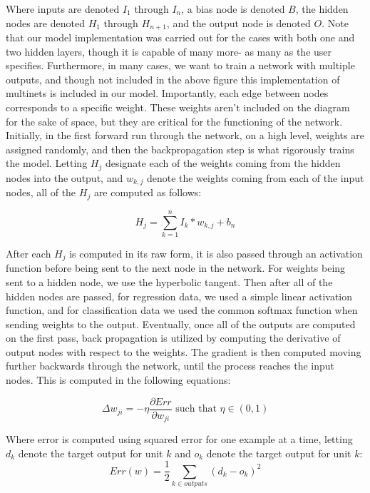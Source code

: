 \documentclass[twoside,11pt]{article}
\begin{document}
Where inputs are denoted $I_1$ through $I_n$, a bias node is denoted $B$, the hidden nodes are denoted $H_1$ through $H_{n+1}$, and 
the output node is denoted $O$. Note that our model implementation was carried out for the cases with both one and two hidden layers, though
it is capable of many more- as many as the user specifies.
Furthermore, in many cases, we want to train a network with multiple outputs, and though not included in the above figure this implementation
of multinets is included in our model.
Importantly, each edge between nodes corresponds to a specific weight. These weights aren't included on
the diagram for the sake of space, but they are critical for the functioning of the network. Initially, in the first forward run through the network, 
on a high level, weights are assigned randomly, and then the backpropagation
step is what rigorously trains the model.
Letting $H_j$ designate each of the weights coming from the hidden nodes into the output, and $w_{k,j}$ denote the weights coming from
each of the input nodes, all of the $H_j$ are computed as follows:

\begin{equation}
	H_j = \sum_{k = 1}^{n} I_k*w_{k,j} + b_n
\end{equation}

After each $H_j$ is computed in its raw form, it is also passed through an activation function before being sent to the next node in the network.
For weights being sent to a hidden node, we use the hyperbolic tangent.
Then after all of the hidden nodes are passed, for regression data, we used a simple linear activation function, and for classification data we used 
the common softmax function when sending weights to the output.
Eventually, once all of the outputs are computed on the first pass, back propagation is utilized by computing the derivative of output nodes 
with respect to the weights. The gradient is then computed moving further backwards through the network, until the process reaches
the input nodes. This is computed in the following equations:

\begin{equation}
	\Delta w_{ji} = - \eta \frac{\partial Err}{\partial w_{ji}} \text{ such that } \eta \in (0,1)
\end{equation}

Where error is computed using squared error for one example at a time, letting $d_k$ denote the target output for unit $k$ and 
$o_k$ denote the target output for unit $k$:
\begin{equation}
	Err(w) = \frac{1}{2} \sum_{k \in outputs}(d_k - o_k)^2
\end{equation}
\end{document}
